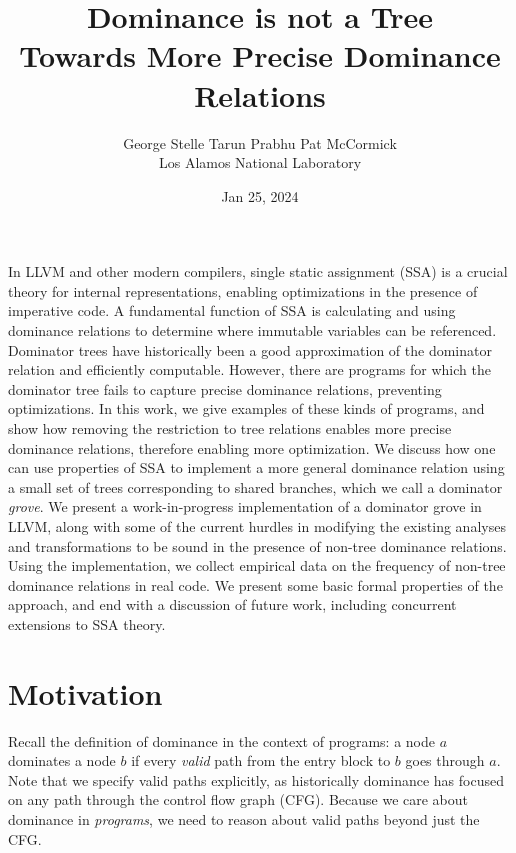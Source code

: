 \documentclass[a4paper,twocolumn]{article}
\title{Dominance is not a Tree \\
\Large{Towards More Precise Dominance Relations}}
\date{Jan 25, 2024}
\author{George Stelle \; Tarun Prabhu \; Pat McCormick \\ Los Alamos National Laboratory}
\begin{document}
\maketitle

In LLVM and other modern compilers, single static assignment (SSA) is a crucial
theory for internal representations, enabling optimizations in the presence of
imperative code. A fundamental function of SSA is calculating and using
dominance relations to determine where immutable variables can be referenced.
Dominator trees have historically been a good approximation of the dominator
relation and efficiently computable. However, there are programs for which the
dominator tree fails to capture precise dominance relations, preventing
optimizations. In this work, we give examples of these kinds of programs,
and show how removing the restriction to tree relations enables more precise
dominance relations, therefore enabling more optimization. We discuss how one
can use properties of SSA to implement a more general dominance relation using
a small set of trees corresponding to shared branches, which we call a
dominator \emph{grove}. We present a work-in-progress implementation of a
dominator grove in LLVM, along with some of the current hurdles in modifying
the existing analyses and transformations to be sound in the presence of
non-tree dominance relations. Using the implementation, we collect empirical
data on the frequency of non-tree dominance relations in real code. We present
some basic formal properties of the approach, and end with a discussion of
future work, including concurrent extensions to SSA theory.  

\section*{Motivation}
Recall the definition of dominance in the context of programs: a node $a$
dominates a node $b$ if every \emph{valid} path from the entry block to $b$ goes
through $a$. Note that we specify valid paths explicitly, as historically
dominance has focused on any path through the control flow graph (CFG).
Because we care about dominance in \emph{programs}, we need to reason about
valid paths beyond just the CFG. 
\end{document}
